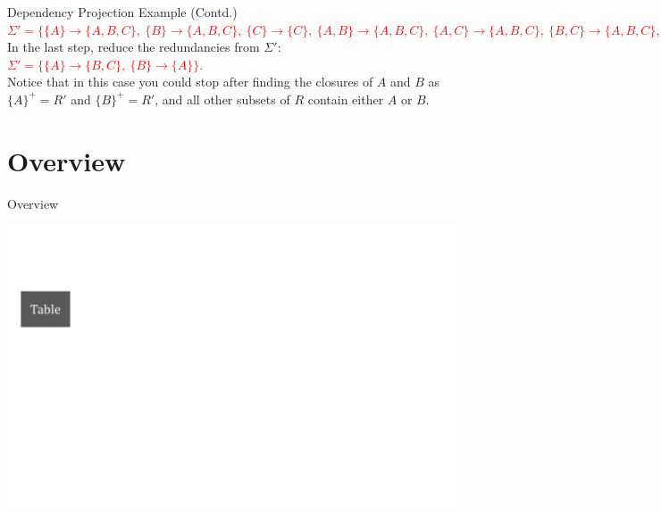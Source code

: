 \documentclass[UTF8]{beamer}
\begin{document}
\begin{frame}{Dependency Projection Example (Contd.)}
\textcolor{red}{$\displaystyle
      \Sigma'=\big\{
        \{A\}\!\to\!\{A,B,C\},\
        \{B\}\!\to\!\{A,B,C\},\
        \{C\}\!\to\!\{C\},\
        \{A,B\}\!\to\!\{A,B,C\},\
        \{A,C\}\!\to\!\{A,B,C\},\
        \{B,C\}\!\to\!\{A,B,C\},\
        \{A,B,C\}\!\to\!\{A,B,C\}
      \big\}.
    $}\\
    In the last step, reduce the redundancies from $\Sigma'$:\\
    \textcolor{red}{$\displaystyle
      \Sigma'=\big\{
        \{A\}\!\to\!\{B,C\},\
        \{B\}\!\to\!\{A\}
      \big\}.
    $}\\
    Notice that in this case you could stop after finding the closures of $A$ and $B$ as $\{A\}^+ = R'$ and $\{B\}^+ = R'$, and all other subsets of $R$ contain either $A$ or $B$.
\end{frame}

\section{Overview}
\begin{frame}{Overview}
\begin{center}
    \includegraphics[width = 1\linewidth]{fd_norm_images/01.png}
\end{center}
\end{frame}
\end{document}
